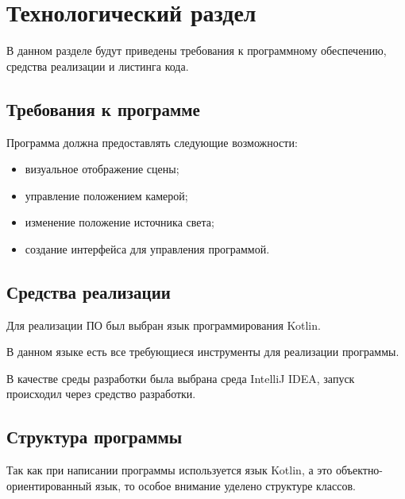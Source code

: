 \chapter{Технологический раздел}

В данном разделе будут приведены требования к программному обеспечению, средства реализации и листинга кода.


\section{Требования к программе} 
Программа должна предоставлять следующие возможности:
\begin{itemize}
	\item визуальное отображение сцены;
	\item управление положением камерой;
	\item изменение положение источника света;
	\item создание интерфейса для управления программой.
\end{itemize}

\section{Средства реализации} 
Для реализации ПО был выбран язык программирования Kotlin\cite{python}. 

В данном языке есть все требующиеся инструменты для реализации программы.

В качестве среды разработки была выбрана среда IntelliJ IDEA\cite{vscode}, запуск происходил через средство разработки.

\section{Структура программы}
Так как при написании программы используется язык Kotlin, а это объектно-ориентированный язык, то особое внимание уделено структуре классов.

